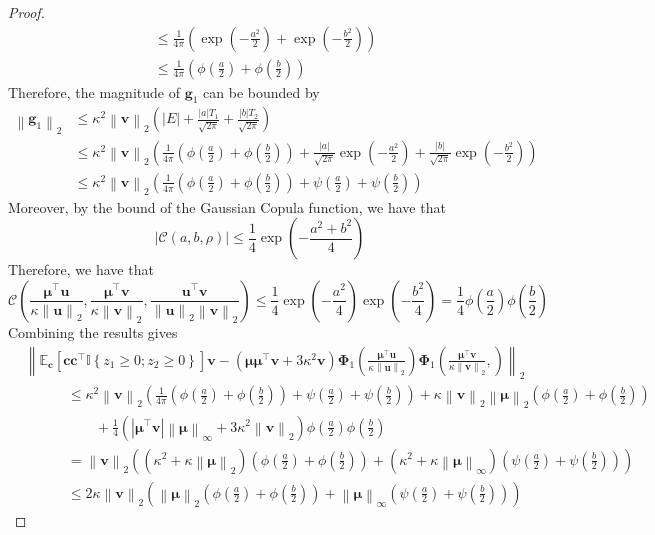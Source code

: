 \documentclass[10pt,a4paper]{amsart}
\def\bfc{{\mathbf{c}}}\def\bfd{{\mathbf{d}}}
\def\bfg{{\mathbf{g}}}\def\bfh{{\mathbf{h}}}
\def\bfu{{\mathbf{u}}}\def\bfv{{\mathbf{v}}}\def\bfw{{\mathbf{w}}}\def\bfx{{\mathbf{x}}}
\def\bfv{{\mathbf{v}}}\def\bfw{{\mathbf{w}}}\def\bfx{{\mathbf{x}}}
\newcommand{\indy}[1]{\mathbb{I}\left\{#1\right\}}
\newcommand{\norm}[1]{\left\|#1\right\|}
\newcommand{\paren}[1]{\left(#1\right)}
\providecommand{\E}{\mathbb{E}}
\begin{document}
\begin{proof}
\begin{align*}
        & \leq \frac{1}{4\pi}\paren{\exp\paren{-\frac{a^2}{2}} + \exp\paren{-\frac{b^2}{2}}}\\
        & \leq  \frac{1}{4\pi}\paren{\phi\paren{\frac{a}{2}} + \phi\paren{\frac{b}{2}}}
    \end{align*}
    Therefore, the magnitude of $\bfg_1$ can be bounded by
    \begin{equation}
        \label{eq:g1_bound}
        \begin{aligned}
            \norm{\bfg_1}_2 & \leq \kappa^2\norm{\bfv}_2\paren{\left|E\right| + \frac{\left|a\right|T_1}{\sqrt{2\pi}} + \frac{\left|b\right|T_2}{\sqrt{2\pi}}}\\
            & \leq \kappa^2\norm{\bfv}_2\paren{\frac{1}{4\pi}\paren{\phi\paren{\frac{a}{2}} + \phi\paren{\frac{b}{2}}} + \frac{\left|a\right|}{\sqrt{2\pi}}\exp\paren{-\frac{a^2}{2}} + \frac{\left|b\right|}{\sqrt{2\pi}}\exp\paren{-\frac{b^2}{2}}}\\
            & \leq \kappa^2\norm{\bfv}_2\paren{\frac{1}{4\pi}\paren{\phi\paren{\frac{a}{2}} + \phi\paren{\frac{b}{2}}} + \psi\paren{\frac{a}{2}} + \psi\paren{\frac{b}{2}}}
        \end{aligned}
    \end{equation}
    Moreover, by the bound of the Gaussian Copula function, we have that
    \[
        \left|\mathcal{C}\paren{a,b,\rho}\right|\leq \frac{1}{4}\exp\paren{-\frac{a^2+b^2}{4}}
    \]
    Therefore, we have that
    \[
        \mathcal{C}\paren{\frac{\bm{\mu}^\top\bfu}{\kappa\norm{\bfu}_2}, \frac{\bm{\mu}^\top\bfv}{\kappa\norm{\bfv}_2}, \frac{\bfu^\top\bfv}{\norm{\bfu}_2\norm{\bfv}_2}} \leq \frac{1}{4}\exp\paren{-\frac{a^2}{4}}\exp\paren{-\frac{b^2}{4}} = \frac{1}{4}\phi\paren{\frac{a}{2}}\phi\paren{\frac{b}{2}}
    \]
    Combining the results gives
    \begin{align*}
        & \norm{\E_{\bfc}\left[\bfc\bfc^\top\indy{z_1\geq 0;z_2\geq 0}\right]\bfv - \paren{\bm{\mu}\bm{\mu}^\top\bfv + 3\kappa^2\bfv}\bm{\Phi}_1\paren{\frac{\bm{\mu}^\top\bfu}{\kappa\norm{\bfu}_2}}\bm{\Phi}_1\paren{\frac{\bm{\mu}^\top\bfv}{\kappa\norm{\bfv}_2},}}_2\\
        & \quad\quad\quad \leq \kappa^2\norm{\bfv}_2\paren{\frac{1}{4\pi}\paren{\phi\paren{\frac{a}{2}} + \phi\paren{\frac{b}{2}}} + \psi\paren{\frac{a}{2}} + \psi\paren{\frac{b}{2}}} + \kappa\norm{\bfv}_2\norm{\bm{\mu}}_2\paren{\phi\paren{\frac{a}{2}} + \phi\paren{\frac{b}{2}}}\\
        & \quad\quad\quad\quad\quad + \frac{1}{4}\paren{\left|\bm{\mu}^\top\bfv\right|\norm{\bm{\mu}}_{\infty} + 3\kappa^2\norm{\bfv}_2}\phi\paren{\frac{a}{2}}\phi\paren{\frac{b}{2}}\\
        & \quad\quad\quad = \norm{\bfv}_2\paren{\paren{\kappa^2 + \kappa\norm{\bm{\mu}}_2}\paren{\phi\paren{\frac{a}{2}} + \phi\paren{\frac{b}{2}}} + \paren{\kappa^2+\kappa\norm{\bm{\mu}}_{\infty}}\paren{\psi\paren{\frac{a}{2}} + \psi\paren{\frac{b}{2}}}}\\
        & \quad\quad\quad \leq 2\kappa\norm{\bfv}_2\paren{\norm{\bm{\mu}}_2\paren{\phi\paren{\frac{a}{2}} + \phi\paren{\frac{b}{2}}} + \norm{\bm{\mu}}_{\infty}\paren{\psi\paren{\frac{a}{2}} + \psi\paren{\frac{b}{2}}}}
    \end{align*}
\end{proof}
\end{document}
